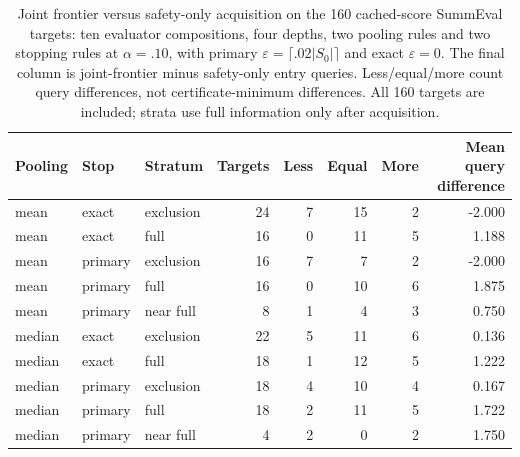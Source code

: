 \begin{table}[t]
\centering\small
\begin{tabular}{lllrrrrr}\toprule
Pooling & Stop & Stratum & Targets & Less & Equal & More & Mean query difference\\\midrule
mean & exact & exclusion & 24 & 7 & 15 & 2 & -2.000 \\
mean & exact & full & 16 & 0 & 11 & 5 & 1.188 \\
mean & primary & exclusion & 16 & 7 & 7 & 2 & -2.000 \\
mean & primary & full & 16 & 0 & 10 & 6 & 1.875 \\
mean & primary & near full & 8 & 1 & 4 & 3 & 0.750 \\
median & exact & exclusion & 22 & 5 & 11 & 6 & 0.136 \\
median & exact & full & 18 & 1 & 12 & 5 & 1.222 \\
median & primary & exclusion & 18 & 4 & 10 & 4 & 0.167 \\
median & primary & full & 18 & 2 & 11 & 5 & 1.722 \\
median & primary & near full & 4 & 2 & 0 & 2 & 1.750 \\
\bottomrule\end{tabular}
\caption{Joint frontier versus safety-only acquisition on the 160 cached-score SummEval targets: ten evaluator compositions, four depths, two pooling rules and two stopping rules at $\alpha=.10$, with primary $\varepsilon=\lceil.02|S_0|\rceil$ and exact $\varepsilon=0$. The final column is joint-frontier minus safety-only entry queries. Less/equal/more count query differences, not certificate-minimum differences. All 160 targets are included; strata use full information only after acquisition.}
\label{tab:summeval-strata}\end{table}

